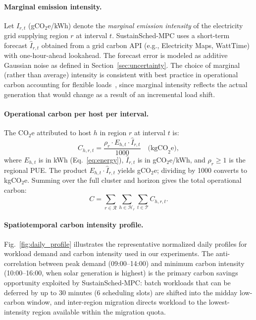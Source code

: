 \documentclass[a4paper,fleqn]{cas-dc}
\begin{document}
\paragraph{Marginal emission intensity.}
Let $I_{r,t}$ (gCO$_2$e/kWh) denote the \emph{marginal emission intensity} of the electricity grid supplying region $r$ at interval $t$. SustainSched-MPC uses a short-term forecast $\hat{I}_{r,t}$ obtained from a grid carbon API (e.g., Electricity Maps, WattTime) with one-hour-ahead lookahead. The forecast error is modeled as additive Gaussian noise as defined in Section~\ref{sec:uncertainty}. The choice of marginal (rather than average) intensity is consistent with best practice in operational carbon accounting for flexible loads~\cite{ref-radovanovic21,ref-hall24}, since marginal intensity reflects the actual generation that would change as a result of an incremental load shift.

\paragraph{Operational carbon per host per interval.}
The CO$_2$e attributed to host $h$ in region $r$ at interval $t$ is:
\begin{equation}
\label{eq:carbon_per_host}
C_{h,r,t} = \frac{\rho_r \cdot E_{h,t} \cdot \hat{I}_{r,t}}{1000} \quad \text{(kgCO}_2\text{e)},
\end{equation}
where $E_{h,t}$ is in kWh (Eq.~\eqref{eq:energy}), $\hat{I}_{r,t}$ is in gCO$_2$e/kWh, and $\rho_r \geq 1$ is the regional PUE. The product $E_{h,t}\cdot\hat{I}_{r,t}$ yields gCO$_2$e; dividing by 1000 converts to kgCO$_2$e. Summing over the full cluster and horizon gives the total operational carbon:
\begin{equation}
\label{eq:total_carbon}
C = \sum_{r \in \mathcal{R}} \sum_{h \in \mathcal{H}_r} \sum_{t \in \mathcal{T}} C_{h,r,t}.
\end{equation}

\paragraph{Spatiotemporal carbon intensity profile.}
Fig.~\ref{fig:daily_profile} illustrates the representative normalized daily profiles for workload demand and carbon intensity used in our experiments. The anti-correlation between peak demand (09:00--14:00) and minimum carbon intensity (10:00--16:00, when solar generation is highest) is the primary carbon savings opportunity exploited by SustainSched-MPC: batch workloads that can be deferred by up to 30 minutes (6 scheduling slots) are shifted into the midday low-carbon window, and inter-region migration directs workload to the lowest-intensity region available within the migration quota.
\end{document}
